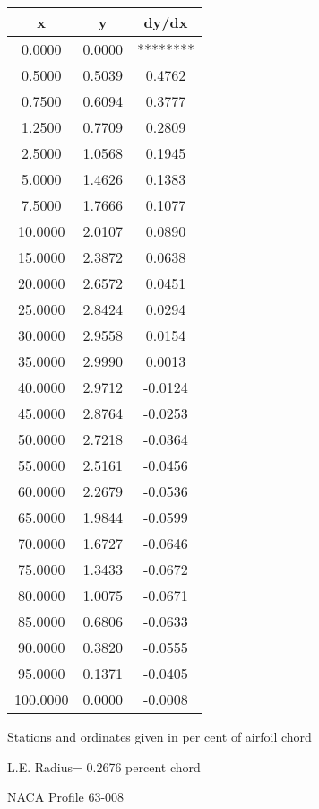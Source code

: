 \documentclass[11pt]{book}
\begin{document}
 \vspace{8mm}
 \begin{tabular}{|c|c|c|} \hline 
  x  &  y  &  dy/dx \\
 \hline
0.0000 & 0.0000 & ******** \\
0.5000 & 0.5039 & 0.4762 \\
0.7500 & 0.6094 & 0.3777 \\
1.2500 & 0.7709 & 0.2809 \\
2.5000 & 1.0568 & 0.1945 \\
5.0000 & 1.4626 & 0.1383 \\
7.5000 & 1.7666 & 0.1077 \\
10.0000 & 2.0107 & 0.0890 \\
15.0000 & 2.3872 & 0.0638 \\
20.0000 & 2.6572 & 0.0451 \\
25.0000 & 2.8424 & 0.0294 \\
30.0000 & 2.9558 & 0.0154 \\
35.0000 & 2.9990 & 0.0013 \\
40.0000 & 2.9712 & -0.0124 \\
45.0000 & 2.8764 & -0.0253 \\
50.0000 & 2.7218 & -0.0364 \\
55.0000 & 2.5161 & -0.0456 \\
60.0000 & 2.2679 & -0.0536 \\
65.0000 & 1.9844 & -0.0599 \\
70.0000 & 1.6727 & -0.0646 \\
75.0000 & 1.3433 & -0.0672 \\
80.0000 & 1.0075 & -0.0671 \\
85.0000 & 0.6806 & -0.0633 \\
90.0000 & 0.3820 & -0.0555 \\
95.0000 & 0.1371 & -0.0405 \\
100.0000 & 0.0000 & -0.0008 \\
 \hline
 \end{tabular}
 \vspace{8mm}


Stations and ordinates given in per cent of airfoil chord 


L.E. Radius=  0.2676 percent chord
 \newpage
  \label{p63-008}
 \begin{Large}
 NACA Profile 63-008
 \end{Large}
  
\end{document}
